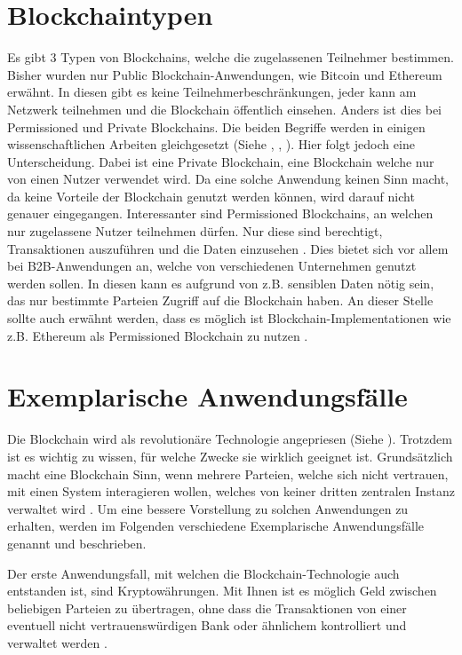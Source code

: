\section{Blockchaintypen}
Es gibt 3 Typen von Blockchains, welche die zugelassenen Teilnehmer bestimmen. Bisher wurden nur Public Blockchain-Anwendungen, wie Bitcoin und Ethereum erwähnt. In diesen gibt es keine Teilnehmerbeschränkungen, jeder kann am Netzwerk teilnehmen und die Blockchain öffentlich einsehen. Anders ist dies bei Permissioned und Private Blockchains. Die beiden Begriffe werden in einigen wissenschaftlichen Arbeiten gleichgesetzt (Siehe \cite{Gramolidangerprivateblockchains2016}, \cite{PongnumkulPerformanceAnalysisPrivate2017a}, \cite{LiScalablePrivateIndustrial2017}). Hier folgt jedoch eine Unterscheidung. Dabei ist eine Private Blockchain, eine Blockchain welche nur von einen Nutzer verwendet wird. Da eine solche Anwendung keinen Sinn macht, da keine Vorteile der Blockchain genutzt werden können, wird darauf nicht genauer eingegangen. Interessanter sind Permissioned Blockchains, an welchen nur zugelassene Nutzer teilnehmen dürfen. Nur diese sind berechtigt, Transaktionen auszuführen und die Daten einzusehen \cite{LiScalablePrivateIndustrial2017}. Dies bietet sich vor allem bei B2B-Anwendungen an, welche von verschiedenen Unternehmen genutzt werden sollen. In diesen kann es aufgrund von z.B. sensiblen Daten nötig sein, das nur bestimmte Parteien Zugriff auf die Blockchain haben.
An dieser Stelle sollte auch erwähnt werden, dass es möglich ist Blockchain-Implementationen wie z.B. Ethereum als Permissioned Blockchain zu nutzen \cite{MercuryProtocolHowCreateYour2017}.

\label{subsec:use-cases}
\section{Exemplarische Anwendungsfälle}
Die Blockchain wird als revolutionäre Technologie angepriesen (Siehe \cite{TapscottBlockchainRevolutionWieTechnologie2016}). Trotzdem ist es wichtig zu wissen, für welche Zwecke sie wirklich geeignet ist. Grundsätzlich macht eine Blockchain Sinn, wenn mehrere Parteien, welche sich nicht vertrauen, mit einen System interagieren wollen, welches von keiner dritten zentralen Instanz verwaltet wird \cite{WustyouneedBlockchain2017}. Um eine bessere Vorstellung zu solchen Anwendungen zu erhalten, werden im Folgenden verschiedene Exemplarische Anwendungsfälle genannt und beschrieben.

Der erste Anwendungsfall, mit welchen die Blockchain-Technologie auch entstanden ist, sind Kryptowährungen. Mit Ihnen ist es möglich Geld zwischen beliebigen Parteien zu übertragen, ohne dass die Transaktionen von einer eventuell nicht vertrauenswürdigen Bank oder ähnlichem kontrolliert und verwaltet werden \cite{SwanBlockchainblueprintnew2015}.

